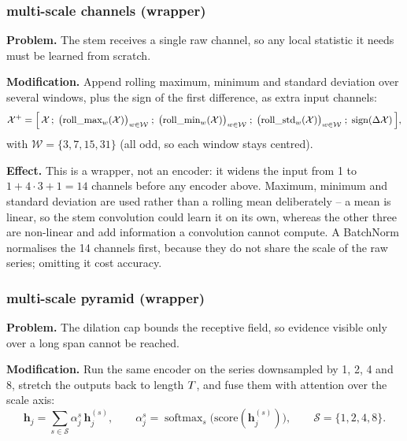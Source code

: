 \subsubsection{\seanet{} multi-scale channels (wrapper)}
\label{sec:var:mschan}

\textbf{Problem.} The stem receives a single raw channel, so any local statistic it needs must be
learned from scratch.

\textbf{Modification.} Append rolling maximum, minimum and standard deviation over several windows,
plus the sign of the first difference, as extra input channels:
\begin{equation}
  \mathcal{X}^{+} = \Big[\, \mathcal{X} \,;\; \big(\text{roll\_max}_w(\mathcal{X})\big)_{w \in \mathcal{W}} \;;\;
  \big(\text{roll\_min}_w(\mathcal{X})\big)_{w \in \mathcal{W}} \;;\;
  \big(\text{roll\_std}_w(\mathcal{X})\big)_{w \in \mathcal{W}} \;;\; \operatorname{sign}(\Delta \mathcal{X}) \,\Big] ,
  \label{eq:mschan}
\end{equation}
with $\mathcal{W} = \{3,7,15,31\}$ (all odd, so each window stays centred).

\textbf{Effect.} This is a wrapper, not an encoder: it widens the input from 1 to
$1 + 4 \cdot 3 + 1 = 14$ channels before any encoder above. Maximum, minimum and standard deviation
are used rather than a rolling mean deliberately -- a mean is linear, so the stem convolution could
learn it on its own, whereas the other three are non-linear and add information a convolution cannot
compute. A BatchNorm normalises the 14 channels first, because they do not share the scale of the
raw series; omitting it cost accuracy.

\subsubsection{\seanet{} multi-scale pyramid (wrapper)}
\label{sec:var:pyramid}

\textbf{Problem.} The dilation cap bounds the receptive field, so evidence visible only over a long
span cannot be reached.

\textbf{Modification.} Run the same encoder on the series downsampled by 1, 2, 4 and 8, stretch the
outputs back to length $T$, and fuse them with attention over the scale axis:
\begin{equation}
  \mathbf{h}_j = \sum_{s \in \mathcal{S}} \alpha_j^{s} \, \mathbf{h}_j^{(s)} ,
  \qquad
  \alpha_j^{s} = \operatorname{softmax}_{s}\big(\text{score}(\mathbf{h}_j^{(s)})\big),
  \qquad \mathcal{S} = \{1,2,4,8\} .
  \label{eq:pyramid_fusion}
\end{equation}


